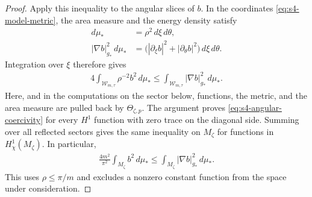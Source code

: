\documentclass[a4paper,11pt,oneside,reqno]{amsart}
\numberwithin{equation}{section}
\theoremstyle{definition}
\begin{document}
\begin{proof}
    Apply this inequality to the angular slices of $b$.
    In the coordinates \eqref{eq:s4-model-metric},
    the area measure and the energy density satisfy
    \begin{align*}
        d\mu_*&=\rho^2\,d\xi\,d\theta,\\
        |\nabla b|_{g_*}^2\,d\mu_*
        &=\bigl(|\partial_\xi b|^2
                   +|\partial_\theta b|^2\bigr)
                     \,d\xi\,d\theta.
    \end{align*}
    Integration over $\xi$ therefore gives
    \begin{align}
        \label{eq:s4-angular-coercivity}
        4\int_{\mathcal W_{m,\tau}}\rho^{-2}b^2\,d\mu_*
        \leq\int_{\mathcal W_{m,\tau}}
                  |\nabla b|_{g_*}^2\,d\mu_*.
    \end{align}
    Here, and in the computations on the sector below,
    functions, the metric, and the area measure are
    pulled back by $\Theta_{\zeta,p}$.
    The argument proves \eqref{eq:s4-angular-coercivity}
    for every $H^1$ function with zero trace on the
    diagonal side. Summing over all reflected sectors
    gives the same inequality on $M_\zeta$ for functions
    in $H^1_\chi(M_\zeta)$. In particular,
    \begin{align*}
        \frac{4m^2}{\pi^2}
        \int_{M_\zeta}b^2\,d\mu_*
        \leq\int_{M_\zeta}|\nabla b|_{g_*}^2\,d\mu_*.
    \end{align*}
    This uses $\rho\leq\pi/m$ and excludes a nonzero
    constant function from the space under consideration.


\end{proof}
\end{document}
